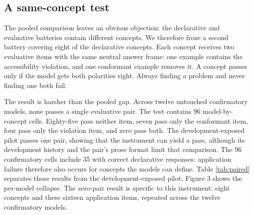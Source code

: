 \documentclass[
  english,
]{article}
\newcounter{none} %
\begin{document}
\subsection{A same-concept test}\label{a-same-concept-test}

The pooled comparison leaves an obvious objection: the declarative and evaluative batteries contain different concepts. We therefore froze a second battery covering eight of the declarative concepts. Each concept receives two evaluative items with the same neutral answer frame: one example contains the accessibility violation, and one conformant example removes it. A concept passes only if the model gets both polarities right. Always finding a problem and never finding one both fail.

The result is harsher than the pooled gap. Across twelve untouched confirmatory models, none passes a single evaluative pair. The test contains 96 model-by-concept cells. Eighty-five pass neither item, seven pass only the conformant item, four pass only the violation item, and zero pass both. The development-exposed pilot passes one pair, showing that the instrument can yield a pass, although its development history and the pair's prose format limit that comparison. The 96 confirmatory cells include 35 with correct declarative responses: application failure therefore also occurs for concepts the models can define. Table \ref{tab:paired} separates those results from the development-exposed pilot; Figure 3 shows the per-model collapse. The zero-pair result is specific to this instrument: eight concepts and these sixteen application items, repeated across the twelve confirmatory models.
\end{document}
